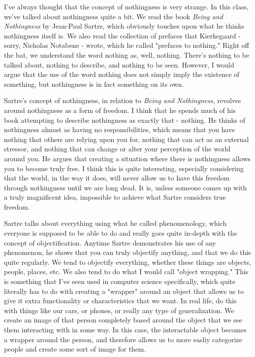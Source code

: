 \documentclass[12pt]{article}
\begin{document}
  I've always thought that the concept of nothingness is very strange. In this class, we've talked about
  nothingness quite a bit. We read the book \textit{Being and Nothingness} by Jean-Paul Sartre, which obviously
  touches upon what he thinks nothingness itself is. We also read the collection of prefaces that Kierkegaard -
  sorry, Nicholas Notabene - wrote, which he called "prefaces to nothing." Right off the bat, we understand the
  word nothing as, well, nothing. There's nothing to be talked about, nothing to describe, and nothing to be seen.
  However, I would argue that the use of the word nothing does not simply imply the existence of something, but
  nothingness is in fact something on its own.

  Sartre's concept of nothingness, in relation to \textit{Being and Nothingness}, revolves around nothingness as
  a form of freedom. I think that he spends much of his book attempting to describe nothingness as exactly that -
  nothing. He thinks of nothingness almost as having no responsibilities, which means that you have nothing that
  others are relying upon you for, nothing that can act as an external stressor, and nothing that can change or
  alter your perception of the world around you. He argues that creating a situation where there is nothingness
  allows you to become truly free. I think this is quite interesting, especially considering that the world, in
  the way it does, will never allow us to have this freedom through nothingness until we are long dead. It is,
  unless someone comes up with a truly magnificent idea, impossible to achieve what Sartre considers true freedom.

  Sartre talks about everything using what he called phenomenology, which everyone is supposed to be able to do
  and really goes quite in-depth with the concept of objectification. Anytime Sartre demonstrates his use of any
  phenomenon, he shows that you can truly objectify anything, and that we do this quite regularly. We tend to
  objectify everything, whether these things are objects, people, places, etc. We also tend to do what I would 
  call "object wrapping." This is something that I've seen used in computer science specifically, which quite 
  literally has to do with creating a "wrapper" around an object that allows us to give it extra functionality 
  or characteristics that we want. In real life, do this with things like our cars, or phones, or really any 
  type of generalization. We create an image of that person completely based around the object that we see them
  interacting with in some way. In this case, the interactable object becomes a wrapper around the person, and
  therefore allows us to more easliy categorize people and create some sort of image for them.
\end{document}
